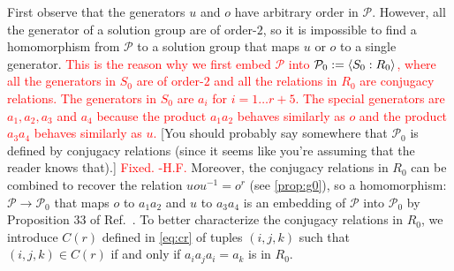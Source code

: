 \documentclass[11pt,letterpaper]{article}
\DeclarePairedDelimiter{\ip}{\langle}{\rangle}
\newcommand{\1}{\mathbb{1}}
\newcommand{\Pg}{\mathcal{P}}
\def\carl#1{{\color{blue} #1}}
\newcommand{\hf}[1]{\textcolor{red}{#1}}
\newcommand{\hfc}[1]{\textcolor{red}{#1 -H.F.}}
\theoremstyle{definition}
\begin{document}
First observe that the generators $u$ and $o$ have arbitrary order in $\Pg$. However, all the generator of a solution
group are of order-$2$, so it is impossible to find a homomorphism from $\Pg$ to a solution group that maps $u$ or $o$
to a single generator. 
\hf{This is the reason why we first embed $\Pg$ into $\Pg_0 := \ip{S_0:R_0}$, where all the generators in $S_0$ are of 
order-$2$ and all the relations in $R_0$ are conjugacy relations.
The generators in $S_0$ are $a_i$ for $i=1 \dots r+5$.
The special generators are $a_1, a_2, a_3$ and $a_4$ because the product $a_1a_2$ behaves similarly as $o$
and the product $a_3a_4$ behaves similarly as $u$.}
\carl{[You should probably
say somewhere that $\mathcal{P}_0$ is defined
by conjugacy relations (since it seems like you're assuming that the reader knows that).]}
\hfc{Fixed.}
Moreover, the conjugacy relations in $R_0$ can be combined to recover the relation $uou^{-1} = o^r$ (see \cref{prop:g0}), so
a homomorphism: $\Pg \rightarrow\Pg_0$  that maps $o$ to $a_1a_2$ and $u$ to $a_3a_4$ is an embedding of $\Pg$ into $\Pg_0$
by Proposition $33$ of Ref.~\cite{slofstra2017}.
To better characterize the conjugacy relations in $R_0$, we introduce $C(r)$ defined in \cref{eq:cr}
of tuples $(i,j,k)$ such that $(i,j,k) \in C(r)$ if and only if $a_ia_ja_i = a_k$ is in $R_0$. 
\end{document}
